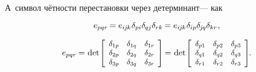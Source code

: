 \begin{otherlanguage}{russian}

\vspace{-0.2em}
А~символ чётности перестановки через детерминант\:--- как

\nopagebreak\vspace{-0.2em}\begin{equation*}
e_{pqr} \hspace{-0.2ex}
= e_{i\hspace{-0.1ex}j\hspace{-0.1ex}k} \hspace{.1ex} \delta_{pi} \delta_{\hspace{-0.1ex}qj} \delta_{rk} \hspace{-0.2ex}
= e_{i\hspace{-0.1ex}j\hspace{-0.1ex}k} \hspace{.1ex} \delta_{ip} \delta_{\hspace{-0.15ex}j\hspace{-0.1ex}q} \delta_{kr}
\hspace{.1ex} ,
\end{equation*}

\nopagebreak\vspace{-0.1em}
\begin{equation}\label{permutationsymbolasdeterminant}
e_{pqr} \hspace{-0.1ex}
= \hspace{.1ex}
\operatorname{det}\hspace{-0.25ex} \scalebox{.92}{$\left[ \begin{array}{ccc}
\delta_{1p} & \delta_{1q} & \delta_{1r} \\
\delta_{2p} & \delta_{2q} & \delta_{2r} \\
\delta_{3p} & \delta_{3q} & \delta_{3r}
\end{array} \hspace{-0.1ex} \right]$} \hspace{-0.2ex}
= \hspace{.1ex}
\operatorname{det}\hspace{-0.25ex} \scalebox{.92}{$\left[ \begin{array}{ccc}
\delta_{p1} & \delta_{p2} & \delta_{p3} \\
\delta_{q1} & \delta_{q2} & \delta_{q3} \\
\delta_{r1} & \delta_{r2} & \delta_{r3}
\end{array} \hspace{-0.1ex} \right]$}
\hspace{-0.2ex} .
\end{equation}


\end{otherlanguage}

